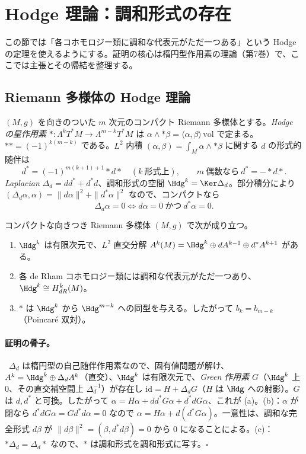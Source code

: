 
\section{Hodge 理論：調和形式の存在}\label{sec:hodge}

この節では「各コホモロジー類に調和な代表元がただ一つある」という Hodge の定理を使えるようにする。証明の核心は楕円型作用素の理論（第7巻）で、ここでは主張とその帰結を整理する。

\subsection{Riemann 多様体の Hodge 理論}
$(M,g)$ を向きのついた $m$ 次元のコンパクト Riemann 多様体とする。\emph{Hodge の星作用素}
$\ast:\Lambda^kT^*M\to\Lambda^{m-k}T^*M$ は $\alpha\wedge\ast\beta=\langle\alpha,\beta\rangle\,\mathrm{vol}$ で定まる。$\ast\ast=(-1)^{k(m-k)}$ である。$L^2$ 内積 $(\alpha,\beta)=\int_M\alpha\wedge\ast\beta$ に関する $d$ の形式的随伴は
\[
d^*=(-1)^{m(k+1)+1}\ast d\ast\quad(k\ \text{形式上}),\qquad m\ \text{偶数なら}\ d^*=-\ast d\ast .
\]
\emph{Laplacian} $\Delta_d=dd^*+d^*d$、調和形式の空間 $\Hdg^k=\Ker\Delta_d$。部分積分により $(\Delta_d\alpha,\alpha)=\|d\alpha\|^2+\|d^*\alpha\|^2$ なので、コンパクトなら
\[
\Delta_d\alpha=0\iff d\alpha=0\ \text{かつ}\ d^*\alpha=0 .
\]
\begin{thm}\label{thm:hodgeR}\tC
コンパクトな向きつき Riemann 多様体 $(M,g)$ で次が成り立つ。
\begin{enumerate}
\item[(a)] $\Hdg^k$ は有限次元で、$L^2$ 直交分解 $A^k(M)=\Hdg^k\oplus d A^{k-1}\oplus d^*A^{k+1}$ がある。
\item[(b)] 各 de Rham コホモロジー類には調和な代表元がただ一つあり、$\Hdg^k\cong H^k_{dR}(M)$。
\item[(c)] $\ast$ は $\Hdg^k$ から $\Hdg^{m-k}$ への同型を与える。したがって $b_k=b_{m-k}$（Poincaré 双対）。
\end{enumerate}
\end{thm}
\paragraph{証明の骨子。}\tP\ $\Delta_d$ は楕円型の自己随伴作用素なので、固有値問題が解け、$A^k=\Hdg^k\oplus\Delta_dA^k$（直交）、$\Hdg^k$ は有限次元で、\emph{Green 作用素} $G$（$\Hdg^k$ 上 $0$、その直交補空間上 $\Delta_d^{-1}$）が存在し $\mathrm{id}=H+\Delta_dG$（$H$ は $\Hdg$ への射影）。$G$ は $d,d^*$ と可換。したがって $\alpha=H\alpha+dd^*G\alpha+d^*dG\alpha$、これが (a)。(b)：$\alpha$ が閉なら $d^*dG\alpha=Gd^*d\alpha=0$ なので $\alpha=H\alpha+d(d^*G\alpha)$。一意性は、調和な完全形式 $d\beta$ が $\|d\beta\|^2=(\beta,d^*d\beta)=0$ から $0$ になることによる。(c)：$\ast\Delta_d=\Delta_d\ast$ なので、$\ast$ は調和形式を調和形式に写す。\hfill$\square$

